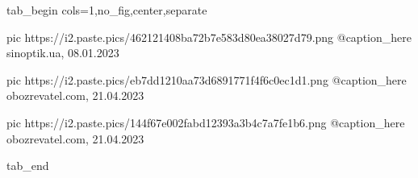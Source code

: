  
 
 
 
 





\ifcmt
  tab_begin cols=1,no_fig,center,separate

		 pic https://i2.paste.pics/462121408ba72b7e583d80ea38027d79.png
     @caption_here sinoptik.ua, 08.01.2023 

		 pic https://i2.paste.pics/eb7dd1210aa73d6891771f4f6c0ec1d1.png
     @caption_here obozrevatel.com, 21.04.2023

     pic https://i2.paste.pics/144f67e002fabd12393a3b4c7a7fe1b6.png
     @caption_here obozrevatel.com, 21.04.2023


  tab_end
\fi
